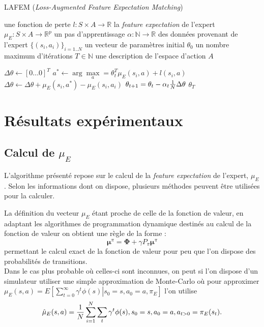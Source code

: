 \documentclass[publibook-draft]{CAp2012}
\begin{document}
\begin{algorithm}
\caption{LAFEM ({\it Loss-Augmented Feature Expectation Matching})}
\label{LAFEM.alg}
\begin{algorithmic}
  \REQUIRE une fonction de perte $l : S\times A \rightarrow \mathbb R$
  \REQUIRE la \emph{feature expectation} de l'expert $\mu_E : S\times A \rightarrow \mathbb R ^p$
  \REQUIRE un pas d'apprentissage $\alpha : \mathbb N \rightarrow \mathbb R$
  \REQUIRE des données provenant de l'expert $\{(s_i,a_i)\}_{i=1..N}$
  \REQUIRE un vecteur de paramètres initial $\theta_0$
  \REQUIRE un nombre maximum d'itérations $T\in \mathbb N$
  \REQUIRE une description de l'espace d'action $A$

     
  \STATE $\Delta\theta \leftarrow [0...0]^T$
    \STATE $a^* \leftarrow \arg\max\limits_{a} = \theta_t ^T \mu_E(s_i,a) + l(s_i,a)$
    \STATE $\Delta\theta \leftarrow \Delta\theta + \mu_E(s_i,a^*) - \mu_E(s_i,a_i)$
    \ENDFOR
    \STATE $\theta_{t+1} = \theta_t -\alpha_t{1\over N}\Delta\theta$
    \ENDFOR
    \RETURN $\theta_T$
\end{algorithmic}
\end{algorithm}
\section{Résultats expérimentaux}

\subsection{Calcul de $\mu_E$}
L'algorithme présenté repose sur le calcul de la {\it feature expectation} de l'expert, $\mu_E$. Selon les informations dont on dispose, plusieurs méthodes peuvent être utilisées pour la calculer.

La définition du vecteur $\mu_E$ étant proche de celle de la fonction de valeur, en adaptant les algorithmes de programmation dynamique destinés au calcul de la fonction de valeur on obtient une règle de la forme :
\begin{equation}
\mathbf \mu^\pi = \mathbf\Phi + \gamma P_\pi\mathbf\mu^\pi
\end{equation}
permettant le calcul exact de la fonction de valeur pour peu que l'on dispose des probabilités de transitions.\\

Dans le cas plus probable où celles-ci sont inconnues, on peut si l'on dispose d'un simulateur utiliser une simple approximation de Monte-Carlo où pour approximer $\mu_E(s,a) = E\left.\left[\sum\limits_{t=0}^\infty \gamma^t \phi(s)\right|s_0 = s, a_0 = a, \pi_E\right]$ l'on utilise 
\begin{equation}
\hat\mu_E(s,a) = {1\over N}\sum\limits_{i=1}^{N}\sum\limits_{t}\gamma^t\phi(s), s_0=s, a_0=a, a_{t>0} = \pi_E(s_t).
\end{equation}
\end{document}
